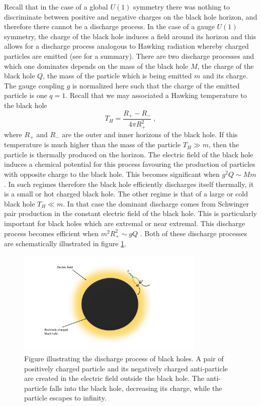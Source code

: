 \documentclass[11pt,a4paper]{article}
\numberwithin{equation}{section}
\numberwithin{table}{section}\setlength{\multlinegap}{25pt}
\newcommand{\be}{\begin{equation}}
\newcommand{\ee}{\end{equation}}
\begin{document}
Recall that in the case of a global $U(1)$ symmetry there was nothing to discriminate between positive and negative charges on the black hole horizon, and therefore there cannot be a discharge process. In the case of a gauge $U(1)$ symmetry, the charge of the black hole induces a field around its horizon and this allows for a discharge process analogous to Hawking radiation whereby charged particles are emitted \cite{gibbons1975} (see \cite{Banks:2006mm} for a summary). There are two discharge processes and which one dominates depends on the mass of the black hole $M$, the charge of the black hole $Q$, the mass of the particle which is being emitted $m$ and its charge. The gauge coupling $g$ is normalized here such that the charge of the emitted particle is one $q=1$. Recall that we may associated a Hawking temperature to the black hole
\be
T_H = \frac{R_+ - R_- }{4\pi R_+^2}  \;,
\ee 
where $R_+$ and $R_-$ are the outer and inner horizons of the black hole.
If this temperature is much higher than the mass of the particle $T_H \gg m$, then the particle is thermally produced on the horizon. The electric field of the black hole induces a chemical potential for this process favouring the production of particles with opposite charge to the black hole. This becomes significant when $g^2 Q \sim M m$ \cite{gibbons1975,Banks:2006mm}. In such regimes therefore the black hole efficiently discharges itself thermally, it is a small or hot charged black hole. The other regime is that of a large or cold black hole $T_H \ll m$. In that case the dominant discharge comes from Schwinger pair production \cite{PhysRev.82.664} in the constant electric field of the black hole. This is particularly important for black holes which are extremal or near extremal. This discharge process becomes efficient when $m^2 R_+^2 \sim g Q$ \cite{gibbons1975,Banks:2006mm}. Both of these discharge processes are schematically illustrated in figure \ref{fig:dbh}.
\begin{figure}[t]
\centering
 \includegraphics[width=0.8\textwidth]{Figdbh.pdf}
\caption{Figure illustrating the discharge process of black holes. A pair of positively charged particle and its negatively charged anti-particle are created in the electric field outside the black hole. The anti-particle falls into the black hole, decreasing its charge, while the particle escapes to infinity.}
\label{fig:dbh}
\end{figure}
\end{document}
